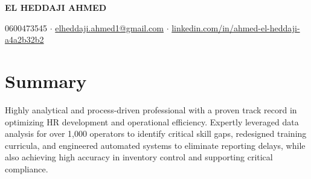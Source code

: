 \documentclass[a4paper,10pt]{article}
\begin{document}
\begin{center}
    {\LARGE \bfseries EL HEDDAJI AHMED}

    \vspace{2mm}
    0600473545 $\cdot$ \href{mailto:elheddaji.ahmed1@gmail.com}{elheddaji.ahmed1@gmail.com} $\cdot$ \href{https://www.linkedin.com/in/ahmed-el-heddaji-a4a2b32b2}{linkedin.com/in/ahmed-el-heddaji-a4a2b32b2}
\end{center}

\section*{Summary}
Highly analytical and process-driven professional with a proven track record in optimizing HR development and operational efficiency. Expertly leveraged data analysis for over 1,000 operators to identify critical skill gaps, redesigned training curricula, and engineered automated systems to eliminate reporting delays, while also achieving high accuracy in inventory control and supporting critical compliance.\vspace{10pt}
\end{document}
